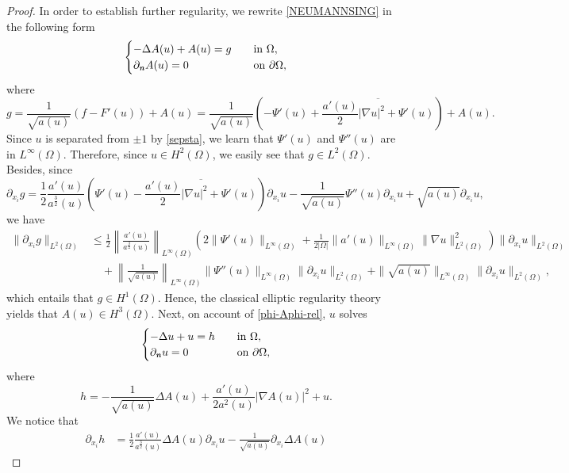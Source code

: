 \documentclass[11pt,reqno]{amsart}
\theoremstyle{remark}
\def\n{\textbf{\textit{n}}}
\def\u{u}
\numberwithin{equation}{section}
\begin{document}
\begin{proof}
\smallskip
In order to establish further regularity, we rewrite \eqref{NEUMANNSING} in the following form
\begin{equation}
\label{Aphi-ELL-0}
\begin{cases}
-\Delta A(\u)+ A(\u) = g \quad &\text{in }\Omega,\\
\partial_{\n} A(\u)=0\quad &\text{on }\partial\Omega,
\end{cases}
\end{equation}
where
$$
g=\frac{1}{\sqrt{a(\u)}}(f-F'(\u))+A(\u)=\frac{1}{\sqrt{a(\u)}}\left(-\Psi'(\u)+\overline{\frac{a'(\u)}{2} |\nabla \u|^2+\Psi'(\u)}\right)+A(\u).
$$
Since $\u$ is separated from $\pm 1$ by \eqref{sepsta}, we learn that $\Psi'(\u)$ and $\Psi''(\u)$ are in $L^\infty(\Omega)$. Therefore, since $\u\in H^2(\Omega)$, we easily see that
$g\in L^2(\Omega)$. Besides, since
$$
\partial_{x_i}g = \frac12
\frac{a'(\u)}{a^\frac32(\u)} \left( \Psi'(\u)-\overline{\frac{a'(\u)}{2} |\nabla \u|^2+\Psi'(\u)}\right) \partial_{x_i} \u
-
\frac{1}{\sqrt{a(\u)}} \Psi''(\u) \partial_{x_i} \u + \sqrt{a(\u)}\partial_{x_i} \u,
$$
we have
\begin{align*}
\|\partial_{x_i}g\|_{L^2(\Omega)} &\leq \frac12
\left\|\frac{a'(\u)}{a^\frac32(\u)}\right\|_{L^\infty(\Omega)} 
\left(  2\|\Psi'(\u)\|_{L^\infty(\Omega)} + \frac{1}{2 |\Omega|} 
\| a'(u)\|_{L^\infty(\Omega)} \| \nabla u\|_{L^2(\Omega)}^2 \right)
\| \partial_{x_i} \u\|_{L^2(\Omega)}\\
&\quad +
\left\|\frac{1}{\sqrt{a(\u)}}\right\|_{L^\infty(\Omega)}\| \Psi''(\u)\|_{L^\infty(\Omega)}\| \partial_{x_i} \u\|_{L^2(\Omega)} + \|\sqrt{a(\u)}\|_{L^\infty(\Omega)}\|\partial_{x_i} \u\|_{L^2(\Omega)},
\end{align*}
which entails that $g\in H^1(\Omega)$. Hence, the classical elliptic regularity theory yields that $A(\u)\in H^3(\Omega)$. Next,
on account of \eqref{phi-Aphi-rel}, $u$ solves
\begin{equation}
\label{Aphi-ELL-0-1}
\begin{cases}
-\Delta \u+ \u = h \quad &\text{in }\Omega,\\
\partial_{\n} \u=0\quad &\text{on }\partial\Omega,
\end{cases}
\end{equation}
where
$$
h=- \frac{1}{\sqrt{a(u)}} \Delta A(u) + \frac{a'(u)}{2 a^2(u)} | \nabla A(u)|^2 +u.
$$
We notice that
\begin{align}
\partial_{x_i} h
&= \frac12 \frac{a'(u)}{a^\frac32 (u)} \Delta A(u) \partial_{x_i} u
- \frac{1}{\sqrt{a(u)}} \partial_{x_i} \Delta A(u)

\end{align}
\end{proof}
\end{document}
